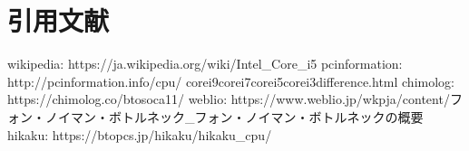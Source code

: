 \documentclass[a4paper,11pt,titlepage]{jarticle}
\begin{document}
 \section{引用文献}
 \begin{thebibliography}{99}
  wikipedia: https://ja.wikipedia.org/wiki/Intel\_Core\_i5
  pcinformation: http://pcinformation.info/cpu/
  corei9\-corei7\-corei5\-corei3\-difference.html
  chimolog: https://chimolog.co/bto\-soc\-a11/
  weblio: https://www.weblio.jp/wkpja/content/フォン・ノイマン・ボトルネック\_フォン・ノイマン・ボトルネックの概要
  hikaku: https://btopcs.jp/hikaku/hikaku\_cpu/
 \end{thebibliography}
\end{document}
